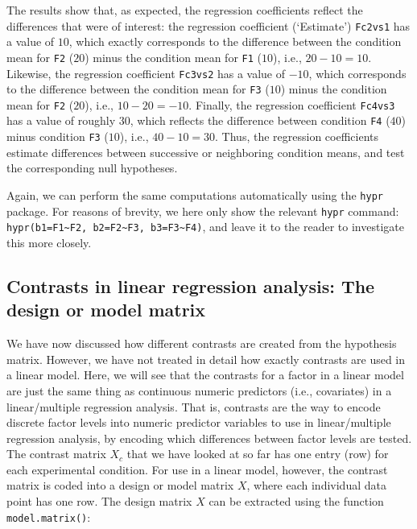 \documentclass[
  12pt,
]{krantz}
\theoremstyle{definition}
\theoremstyle{definition}
\theoremstyle{definition}
\theoremstyle{definition}
\theoremstyle{remark}
\begin{document}
The results show that, as expected, the regression coefficients reflect the differences that were of interest: the regression coefficient (`Estimate') \texttt{Fc2vs1} has a value of \(10\), which exactly corresponds to the difference between the condition mean for \texttt{F2} (\(20\)) minus the condition mean for \texttt{F1} (\(10\)), i.e., \(20 - 10 = 10\). Likewise, the regression coefficient \texttt{Fc3vs2} has a value of \(-10\), which corresponds to the difference between the condition mean for \texttt{F3} (\(10\)) minus the condition mean for \texttt{F2} (\(20\)), i.e., \(10 - 20 = -10\). Finally, the regression coefficient \texttt{Fc4vs3} has a value of roughly \(30\), which reflects the difference between condition \texttt{F4} (\(40\)) minus condition \texttt{F3} (\(10\)), i.e., \(40 - 10 = 30\). Thus, the regression coefficients estimate differences between successive or neighboring condition means, and test the corresponding null hypotheses.

Again, we can perform the same computations automatically using the \texttt{hypr} package. For reasons of brevity, we here only show the relevant \texttt{hypr} command: \texttt{hypr(b1=F1\textasciitilde{}F2,\ b2=F2\textasciitilde{}F3,\ b3=F3\textasciitilde{}F4)}, and leave it to the reader to investigate this more closely.

\hypertarget{contrasts-in-linear-regression-analysis-the-design-or-model-matrix}{%
\subsection{Contrasts in linear regression analysis: The design or model matrix}\label{contrasts-in-linear-regression-analysis-the-design-or-model-matrix}}

We have now discussed how different contrasts are created from the hypothesis matrix. However, we have not treated in detail how exactly contrasts are used in a linear model. Here, we will see that the contrasts for a factor in a linear model are just the same thing as continuous numeric predictors (i.e., covariates) in a linear/multiple regression analysis. That is, contrasts are the way to encode discrete factor levels into numeric predictor variables to use in linear/multiple regression analysis, by encoding which differences between factor levels are tested.
The contrast matrix \(X_c\) that we have looked at so far has one entry (row) for each experimental condition. For use in a linear model, however, the contrast matrix is coded into a design or model matrix \(X\), where each individual data point has one row. The design matrix \(X\) can be extracted using the function \texttt{model.matrix()}:
\end{document}
